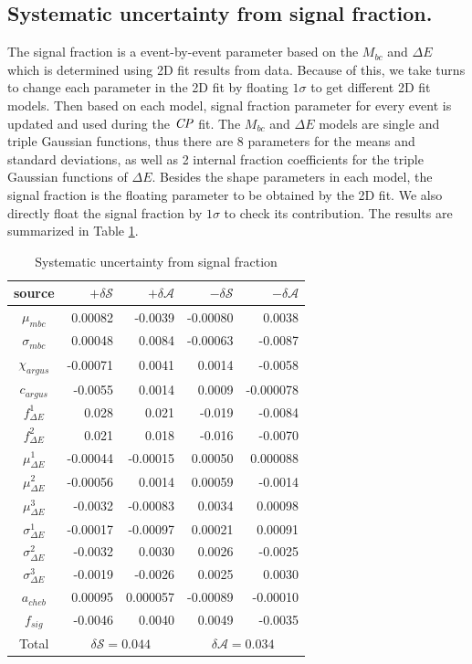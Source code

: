 \subsection{Systematic uncertainty from signal fraction.}
The signal fraction is a event-by-event parameter based on the $M_{bc}$ and $\Delta E$ which is determined using 2D fit results from data. Because of this, we take turns to change each parameter in the 2D fit by floating $1\sigma$ to get different 2D fit models. Then based on each model, signal fraction parameter for every event is updated and used during the $\it{CP}$ fit. The $M_{bc}$ and $\Delta E$ models are single and triple Gaussian functions, thus there are 8 parameters for the means and standard deviations, as well as 2 internal fraction coefficients for the triple Gaussian functions of $\Delta E$. Besides the shape parameters in each model, the signal fraction is the floating parameter to be obtained by the 2D fit. We also directly float the signal fraction by $1\sigma$ to check its contribution. 
The results are summarized in Table \ref{tab:sy_fsig}.
\begin{table}[htpb]
	\begin{minipage}[b]{1.0\linewidth}
		\centering
		\caption{Systematic uncertainty from  signal fraction}
		\label{tab:sy_fsig}
		\begin{tabular}{c r r r r}
			\hline
			source & $+\delta \mathcal{S}$ & $+\delta \mathcal{A}$ & $-\delta \mathcal{S}$ &  $-\delta \mathcal{A}$\\
			\hline
			$\mu_{mbc}$  & 0.00082 &	-0.0039&	-0.00080&	0.0038
			\\
			$\sigma_{mbc}$ & 0.00048 &	0.0084&	-0.00063&	-0.0087
			\\
			$\chi_{argus}$ & -0.00071&	0.0041	&0.0014&	-0.0058
			\\
			$c_{argus}$ & -0.0055&	0.0014&	0.0009&	-0.000078\\
			$f^1_{\Delta E}$ & 0.028 &	0.021&	-0.019	&-0.0084
			\\
			$f^2_{\Delta E}$ & 0.021&	0.018	&-0.016	&-0.0070
			\\
			$\mu^1_{\Delta E}$ & -0.00044&	-0.00015&	0.00050&	0.000088\\
				$\mu^2_{\Delta E}$& -0.00056&	0.0014&	0.00059&	-0.0014
			\\
				$\mu^3_{\Delta E}$ & -0.0032&	-0.00083&	0.0034&	0.00098
			\\
				$\sigma^1_{\Delta E}$& -0.00017&	-0.00097&	0.00021&	0.00091
			\\
			$\sigma^2_{\Delta E}$& -0.0032&	0.0030&	0.0026&	-0.0025
			\\
			$\sigma^3_{\Delta E}$& -0.0019&	-0.0026&	0.0025&	0.0030
			\\
			$a_{cheb}$ & 0.00095&	0.000057&	-0.00089&	-0.00010
			\\
			$f_{sig}$ & -0.0046&	0.0040&	0.0049&	-0.0035
			\\
			\hline
			Total &
			\multicolumn{2}{c}{$\delta \mathcal{S}=0.044$} &
			\multicolumn{2}{c}{$\delta \mathcal{A}=0.034$}\\
			\hline
		\end{tabular}
	\end{minipage}
\end{table}


